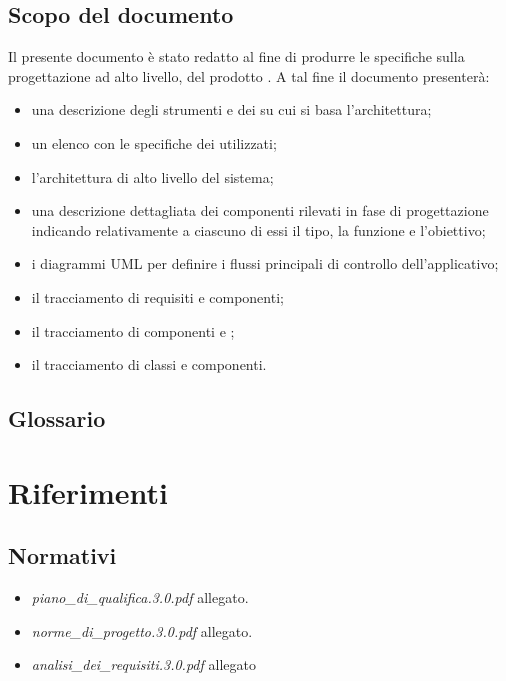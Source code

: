 \subsection{Scopo del documento}
Il presente documento è stato redatto al fine di produrre le specifiche sulla progettazione ad alto livello, del prodotto \caName. A tal fine il documento presenterà:
\begin{itemize}
    \item una descrizione degli strumenti e dei \underline{} su cui si basa l'architettura;
	\item un elenco con le specifiche dei  utilizzati;
	\item l'architettura di alto livello del sistema;
	\item una descrizione dettagliata dei componenti rilevati in fase di progettazione indicando relativamente a ciascuno di essi il tipo, la funzione e l'obiettivo;
	\item i diagrammi UML per definire i flussi principali di controllo dell'applicativo;
	\item il tracciamento di requisiti e componenti;
	\item il tracciamento di componenti e ;
	\item il tracciamento di classi e componenti.
\end{itemize}

\subsection{Glossario}
\glossaryIntro

\clearpage
\section{Riferimenti}

\subsection{Normativi}
\begin{itemize}
\item[] \textit{piano\_di\_qualifica.3.0.pdf} allegato.
\item[] \textit{norme\_di\_progetto.3.0.pdf} allegato.
\item[] \textit{analisi\_dei\_requisiti.3.0.pdf} allegato
\end{itemize}

